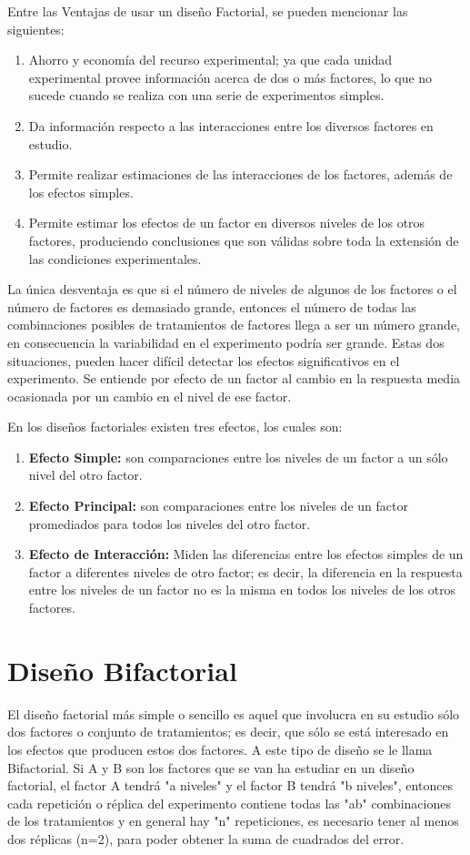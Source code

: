 \documentclass[12pt,letterpaper]{report}
\begin{document}
Entre las Ventajas de usar un diseño Factorial, se pueden mencionar las siguientes:
\begin{enumerate}
\item Ahorro y economía del recurso experimental; ya que cada unidad experimental provee
información acerca de dos o más factores, lo que no sucede cuando se realiza con una serie
de experimentos simples.

\item Da información respecto a las interacciones entre los diversos factores en estudio.

\item Permite realizar estimaciones de las interacciones de los factores, además de los efectos
simples.

\item Permite estimar los efectos de un factor en diversos niveles de los otros factores,
produciendo conclusiones que son válidas sobre toda la extensión de las condiciones
experimentales.
\end{enumerate}

La única desventaja es que si el número de niveles de algunos de los factores o el número
de factores es demasiado grande, entonces el número de todas las combinaciones posibles de
tratamientos de factores llega a ser un número grande, en consecuencia la variabilidad en el
experimento podría ser grande. Estas dos situaciones, pueden hacer difícil detectar los efectos
significativos en el experimento.
Se entiende por efecto de un factor al cambio en la respuesta media ocasionada por un
cambio en el nivel de ese factor.

En los diseños factoriales existen tres efectos, los cuales son:
\begin{enumerate}
\item \textbf{Efecto Simple:} son comparaciones entre los niveles de un factor a un sólo nivel del otro
factor.
\item \textbf{Efecto Principal:} son comparaciones entre los niveles de un factor promediados para
todos los niveles del otro factor.
\item \textbf{Efecto de Interacción:} Miden las diferencias entre los efectos simples de un factor a
diferentes niveles de otro factor; es decir, la diferencia en la respuesta entre los niveles de
un factor no es la misma en todos los niveles de los otros factores.
\end{enumerate}
\newpage
\section*{Diseño Bifactorial}
El diseño factorial más simple o sencillo es aquel que involucra en su estudio sólo dos
factores o conjunto de tratamientos; es decir, que sólo se está interesado en los efectos que
producen estos dos factores. A este tipo de diseño se le llama Bifactorial.
Si A y B son los factores que se van ha estudiar en un diseño factorial, el factor A tendrá
"a niveles" y el factor B tendrá "b niveles", entonces cada repetición o réplica del experimento
contiene todas las "ab" combinaciones de los tratamientos y en general hay "n" repeticiones, es
necesario tener al menos dos réplicas (n=2), para poder obtener la suma de cuadrados del
error.
\end{document}
